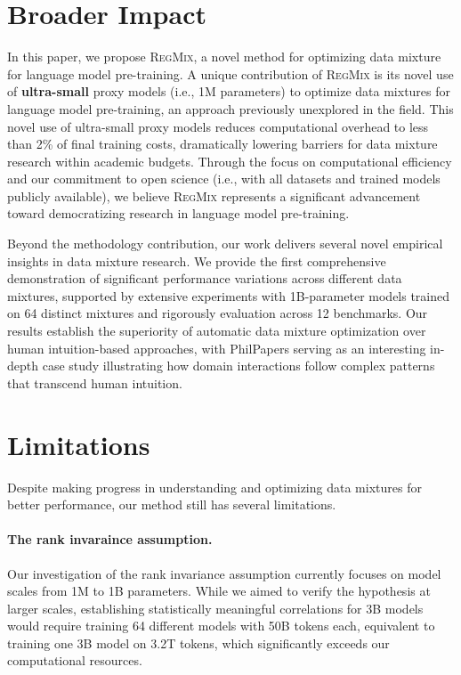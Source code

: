 \documentclass{article}
\theoremstyle{definition}
\theoremstyle{remark}
\newcommand{\ourmethod}{\textsc{RegMix}\xspace}
\begin{document}



\clearpage
\appendix

\section{Broader Impact}\label{sec:broader_impact}

In this paper, we propose \ourmethod, a novel method for optimizing data mixture for language model pre-training. A unique contribution of \ourmethod is its novel use of \textbf{ultra-small} proxy models (i.e., 1M parameters) to optimize data mixtures for language model pre-training, an approach previously unexplored in the field. This novel use of ultra-small proxy models reduces computational overhead to less than 2\% of final training costs, dramatically lowering barriers for data mixture research within academic budgets. Through the focus on computational efficiency and our commitment to open science (i.e., with all datasets and trained models publicly available), we believe \ourmethod represents a significant advancement toward democratizing research in language model pre-training.

Beyond the methodology contribution, our work delivers several novel empirical insights in data mixture research. We provide the first comprehensive demonstration of significant performance variations across different data mixtures, supported by extensive experiments with 1B-parameter models trained on 64 distinct mixtures and rigorously evaluation across 12 benchmarks. Our results establish the superiority of automatic data mixture optimization over human intuition-based approaches, with PhilPapers serving as an interesting in-depth case study illustrating how domain interactions follow complex patterns that transcend human intuition.

\section{Limitations}
\label{sec:limitations}

Despite making progress in understanding and optimizing data mixtures for better performance, our method still has several limitations.

\paragraph{The rank invaraince assumption.} Our investigation of the rank invariance assumption currently focuses on model scales from 1M to 1B parameters. While we aimed to verify the hypothesis at larger scales, establishing statistically meaningful correlations for 3B models would require training 64 different models with 50B tokens each, equivalent to training one 3B model on 3.2T tokens, which significantly exceeds our computational resources.
\end{document}
